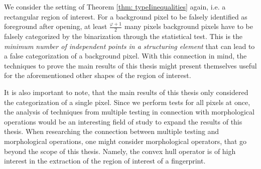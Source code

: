 \documentclass[a4paper,12pt]{article}
\theoremstyle{plain}
\theoremstyle{definition}
\begin{document}
We consider the setting of Theorem \ref{thm: typeIinequalities} again, i.e. a rectangular region of interest. For a background pixel to be falsely identified as foreground after opening, at least $\frac{\varphi + 1}{2}$ many pixels background pixels have to be falsely categorized by the binarization through the statistical test. This is the \emph{minimum number of independent points in a structuring element} that can lead to a false categorization of a background pixel. With this connection in mind, the techniques to prove the main results of this thesis might present themselves useful for the aforementioned other shapes of the region of interest.

It is also important to note, that the main results of this thesis only considered the categorization of a single pixel. Since we perform tests for all pixels at once, the analysis of techniques from multiple testing in connection with morphological operations would be an interesting field of study to expand the results of this thesis. When researching the connection between multiple testing and morphological operations, one might consider morphological operators, that go beyond the scope of this thesis. Namely, the convex hull operator is of high interest in the extraction of the region of interest of a fingerprint.

\newpage
\end{document}
